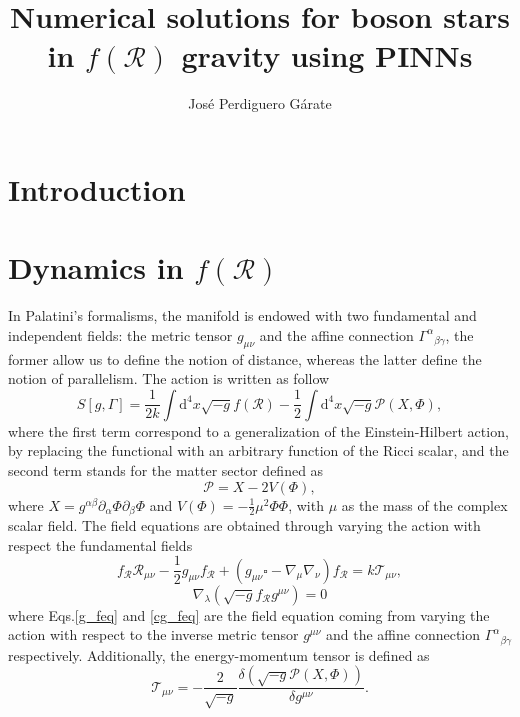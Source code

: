 \documentclass{article}
\title{Numerical solutions for boson stars in $f\left(\mathcal{R}\right)$ gravity using PINNs}
\author{Jos\'e Perdiguero G\'arate}
\begin{document}
\maketitle

\section{Introduction}
\label{sec:introduction}

\section{Dynamics in $f\left(\mathcal{R}\right)$}
\label{sec:dynamics}

In Palatini's formalisms, the manifold is endowed with two fundamental and independent
fields: the metric tensor $g_{\mu\nu}$ and the affine connection $\Gamma^{\alpha}{}_{\beta\gamma}$, 
the former allow us to define the notion of distance, whereas the latter define the notion of 
parallelism. The action is written as follow
\begin{equation}
    S\left[g, \Gamma\right] = \frac{1}{2k}\int \mathrm{d}^{4}x \sqrt{-g}f\left(\mathcal{R}\right) 
    - \frac{1}{2}\int \mathrm{d}^{4}x \sqrt{-g}\mathcal{P}(X, \Phi),
\end{equation}
where the first term correspond to a generalization of the Einstein-Hilbert action, by replacing
the functional with an arbitrary function of the Ricci scalar, and the second term stands for the
matter sector defined as
\begin{equation}
    \mathcal{P}  = X - 2V(\Phi),
\end{equation}
where $X = g^{\alpha\beta}\partial_\alpha {\Phi} \partial_\beta \Phi$ and $V(\Phi) = -\frac{1}{2}\mu^2\Phi\Phi$,
with $\mu$ as the mass of the complex scalar field. The field equations are obtained through varying
the action with respect the fundamental fields
\begin{equation}
\label{g_feq}
    f_{\mathcal{R}}\mathcal{R}_{\mu\nu} - \frac{1}{2}g_{\mu\nu}f_{\mathcal{R}}
    + \left(g_{\mu\nu}\square - \nabla_\mu\nabla_\nu\right)f_{\mathcal{R}} = k \mathcal{T}_{\mu\nu},
\end{equation}
\begin{equation}
\label{cg_feq}
    \nabla_\lambda\left(\sqrt{-g}f_{\mathcal{R}} g^{\mu\nu}\right) = 0
\end{equation}
where Eqs.\eqref{g_feq} and \eqref{cg_feq} are the field equation coming from varying the action with respect
to the inverse metric tensor $g^{\mu\nu}$ and the affine connection $\Gamma^{\alpha}{}_{\beta\gamma}$
respectively. Additionally, the energy-momentum tensor is defined as
\begin{equation}
    \mathcal{T}_{\mu\nu} = -\frac{2}{\sqrt{-g}} \frac{\delta\left(\sqrt{-g}\mathcal{P}(X, \Phi)\right)}{\delta g^{\mu\nu}}.
\end{equation}
\end{document}
